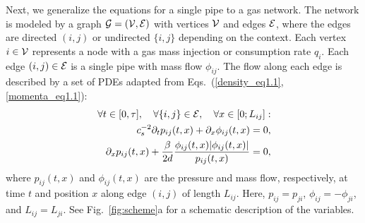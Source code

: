 \documentclass[10pt, conference, compsocconf]{IEEEtran}
\begin{document}
Next, we generalize the equations for a single pipe to a gas network. The network is modeled by a graph ${\cal G}=({\cal V},{\cal E})$ with vertices ${\cal V}$ and edges ${\cal E}$, where the edges are directed $(i,j)$ or undirected $\{i,j\}$ depending on the context. Each vertex $i\in{\cal V}$ represents a node with a gas mass injection or consumption rate $q_i$. Each edge $(i,j)\in{\cal E}$ is a single pipe with mass flow $\phi_{ij}$. The flow along each edge is described by a set of PDEs adapted from Eqs.~(\ref{density_eq1.1},\ref{momenta_eq1.1}):
\begin{eqnarray}
&&\hspace{-0.5cm}\forall t\in [0,\tau],\quad \forall \{i,j\}\in{\cal E},\quad \forall x\in[0;L_{ij}]:\nonumber\\ && c_s^{-2}\partial_t p_{ij}(t,x)+\partial_x \phi_{ij}(t,x)=0,\label{density_eq1}\\
&& \partial_x p_{ij}(t,x)+\frac{\beta}{2d} \frac{\phi_{ij}(t,x) |\phi_{ij}(t,x)|}{p_{ij}(t,x)}=0,\label{momenta_eq1}
\end{eqnarray}
where $p_{ij}(t,x)$ and $\phi_{ij}(t,x)$ are the pressure and mass flow, respectively, at time $t$ and position $x$ along edge $(i,j)$ of length $L_{ij}$. Here, $p_{ij}=p_{ji}$, $\phi_{ij}=-\phi_{ji}$, and $L_{ij}=L_{ji}$.  See Fig.~\ref{fig:scheme}a for a schematic description of the variables.
\end{document}
